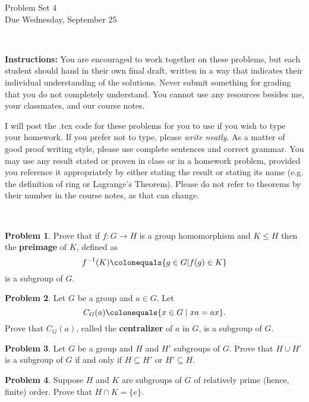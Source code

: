 \documentclass[11pt]{article}
\title{}
\date{\vspace{-0.5in}}
\theoremstyle{definition}
\newtheorem{problem}{Problem}
\begin{document}
\thispagestyle{fancy}
\pagestyle{fancy}

\vspace{3em}

\begin{center}
	{\LARGE Problem Set 4 \\}
	Due Wednesday, September 25
\end{center}

\

\noindent
{\bf Instructions:}
You are encouraged to work together on these problems, but each student should hand in their own final draft, written in a way that indicates their individual understanding of the solutions. Never submit something for grading that you do not completely understand. You cannot use any resources besides me, your classmates, and our course notes.


I will post the .tex code for these problems for you to use if you wish to type your homework. If you prefer not to type, please  {\em write neatly}. As a matter of good proof writing style, please use complete sentences and correct grammar. You may use any result  stated or proven in class or in a homework problem, provided you reference it appropriately by either stating the result or stating its name (e.g. the definition of ring or Lagrange's Theorem). Please do not refer to theorems by their number in the course notes, as that can change.


\



\begin{problem}
Prove that if $f\!:G\to H$ is a group homomorphism and $K\leq H$ then the {\bf preimage} of $K$, defined as 
$$f^{-1}(K) \colonequals \{g\in G | f(g)\in K\}$$ 
is a subgroup of $G$.
\end{problem}

\begin{problem}
Let $G$ be a group and $a\in G$.  Let 
$$C_G(a) \colonequals \{x\in G\mid xa=ax\}.$$
Prove that $C_G(a)$, called the {\bf centralizer} of $a$ in $G$, is a subgroup of $G$.
\end{problem}


\begin{problem}
	Let $G$ be a group and $H$ and $H'$ subgroups of $G$. Prove that $H\cup H'$ is a subgroup of $G$ if and only if $H\subseteq H'$ or $H'\subseteq H$.
\end{problem}


\begin{problem}
Suppose $H$ and $K$ are subgroups of $G$ of relatively prime (hence, finite) order.  Prove that $H\cap K=\{ e \}$.
\end{problem}
\end{document}
